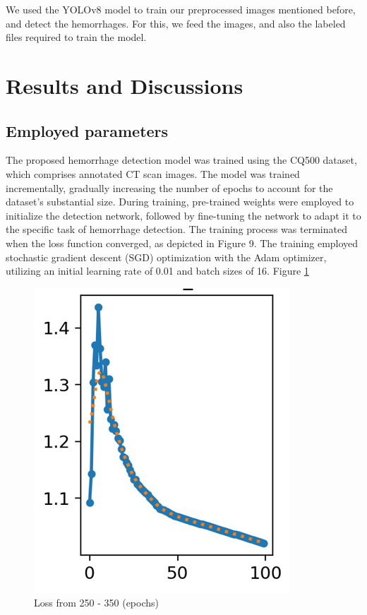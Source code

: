 \documentclass[Print]{../Style/isecure-v24}
\begin{document}
We used the YOLOv8 model to train our preprocessed images mentioned before, and detect the hemorrhages. For this, we feed the images, and also the labeled files required to train the model.


\section{Results and Discussions} \label{sec:results and discussion}
\subsection{Employed parameters} \label{sec: Employed parm}
The proposed hemorrhage detection model was trained using the CQ500 dataset, which comprises annotated CT scan images. The model was trained incrementally, gradually increasing the number of epochs to account for the dataset's substantial size. During training, pre-trained weights were employed to initialize the detection network, followed by fine-tuning the network to adapt it to the specific task of hemorrhage detection. The training process was terminated when the loss function converged, as depicted in Figure 9. The training employed stochastic gradient descent (SGD) optimization with the Adam optimizer, utilizing an initial learning rate of 0.01 and batch sizes of 16. Figure \ref{fig:loss}

{\begin{figure}[h]
    \centering
    \includegraphics[width=1.0\linewidth]{ISeCure Draft/Images/lve250_350.png}
    \captionsetup{font=small}
    \caption{Loss from 250 - 350 (epochs)}
    \label{fig:loss}
\end{figure}}
\end{document}
